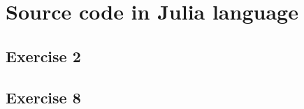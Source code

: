 \documentclass[12pt]{article}
\begin{document}
\appendix
\section{Source code in Julia language}

\subsection*{Exercise 2}


\subsection*{Exercise 8}

\end{document}
